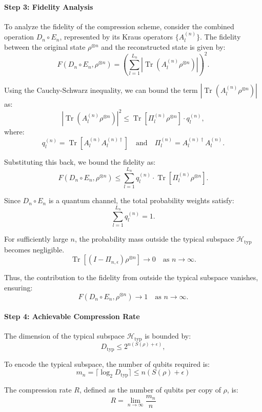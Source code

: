 \paragraph{Step 3: Fidelity Analysis}

To analyze the fidelity of the compression scheme, consider the combined operation \(D_n \circ E_n\), represented by its Kraus operators \(\{A_l^{(n)}\}\). The fidelity between the original state \(\rho^{\otimes n}\) and the reconstructed state is given by:
\[
F(D_n \circ E_n, \rho^{\otimes n}) = \left( \sum_{l=1}^{L_n} \left| \operatorname{Tr}(A_l^{(n)} \rho^{\otimes n}) \right| \right)^2.
\]

Using the Cauchy-Schwarz inequality, we can bound the term \(\left| \operatorname{Tr}(A_l^{(n)} \rho^{\otimes n}) \right|\) as:
\[
\left| \operatorname{Tr}(A_l^{(n)} \rho^{\otimes n}) \right|^2 \leq \operatorname{Tr}[\Pi_l^{(n)} \rho^{\otimes n}] \cdot q_l^{(n)},
\]
where:
\[
q_l^{(n)} = \operatorname{Tr}[A_l^{(n)} A_l^{(n)\dagger}] \quad \text{and} \quad \Pi_l^{(n)} = A_l^{(n)\dagger} A_l^{(n)}.
\]

Substituting this back, we bound the fidelity as:
\[
F(D_n \circ E_n, \rho^{\otimes n}) \leq \sum_{l=1}^{L_n} q_l^{(n)} \cdot \operatorname{Tr}[\Pi_l^{(n)} \rho^{\otimes n}].
\]

Since \(D_n \circ E_n\) is a quantum channel, the total probability weights satisfy:
\[
\sum_{l=1}^{L_n} q_l^{(n)} = 1.
\]

For sufficiently large \(n\), the probability mass outside the typical subspace \(\mathcal{H}_{\text{typ}}\) becomes negligible.
\[
\operatorname{Tr}[(I - \Pi_{n, \epsilon}) \rho^{\otimes n}] \to 0 \quad \text{as } n \to \infty.
\]

Thus, the contribution to the fidelity from outside the typical subspace vanishes, ensuring:
\[
F(D_n \circ E_n, \rho^{\otimes n}) \to 1 \quad \text{as } n \to \infty.
\]

\paragraph{Step 4: Achievable Compression Rate}

The dimension of the typical subspace \(\mathcal{H}_{\text{typ}}\) is bounded by:
\[
D_{\text{typ}} \leq 2^{n(S(\rho) + \epsilon)},
\]

To encode the typical subspace, the number of qubits required is:
\[
m_n = \lceil \log_2 D_{\text{typ}} \rceil \leq n(S(\rho) + \epsilon)
\]

The compression rate \(R\), defined as the number of qubits per copy of \(\rho\), is:
\[
R = \lim_{n \to \infty} \frac{m_n}{n}
\]

